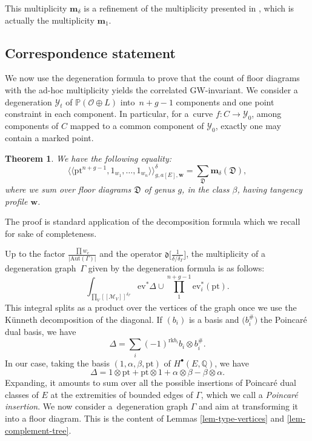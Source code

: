 \documentclass[pdftex]{sigma}
\newcommand{\fvir}[2]{[\![ #1 ]\!]^{#2}}
\newcommand{\ev}{\mathrm{ev}}
\newcommand{\pt}{\mathrm{pt}}
\newcommand{\PP}{\mathbb{P}}
\newcommand{\QQ}{\mathbb{Q}}
\newcommand{\bfw}{ {\boldsymbol w} }
\newcommand{\bfm}{ {\boldsymbol m} }
\newcommand{\Dfk}{\mathfrak{D}}
\newcommand{\dfk}{\mathfrak{d}}
\newcommand{\M}{\mathcal{M}}
\renewcommand{\O}{\mathcal{O}}
\newcommand{\Y}{\mathcal{Y}}
\newcommand{\gen}[1]{\big\langle #1 \big\rangle}
\numberwithin{equation}{section}
\newtheorem{theo}{Theorem}[section]
\theoremstyle{definition}
\begin{document}
This multiplicity $\bfm_\delta$ is a refinement of the multiplicity presented in \cite{blomme2022floor}, which is actually the multiplicity $\bfm_1$.



\subsection{Correspondence statement}

We now use the degeneration formula to prove that the count of floor diagrams with the ad-hoc multiplicity yields the correlated GW-invariant. We consider a degeneration $\Y_t$ of $\PP(\O\oplus L)$ into~${n+g-1}$ components and one point constraint in each component. In particular, for a~curve $f\colon C\to\Y_0$, among components of $C$ mapped to a common component of $\Y_0$, exactly one may contain a marked point.

\begin{theo}\label{theo-correspondence-diagrams}
 We have the following equality:
 \[ \gen{\gen{\pt^{n+g-1},1_{w_1},\dots,1_{w_n}}}^\delta_{g,a[E],\bfw} =
 \sum_\Dfk \bfm_\delta(\Dfk), \]
 where we sum over floor diagrams $\Dfk$ of genus $g$, in the class $\beta$, having tangency profile $\bfw$.
\end{theo}

The proof is standard application of the decomposition formula which we recall for sake of completeness.

Up to the factor $\frac{\prod w_e}{|\mathrm{Aut}(\Gamma)|}$ and the operator $\dfk\big[\frac{1}{\delta/\delta_\Gamma}\big]$, the multiplicity of a degeneration graph~$\Gamma$ given by the degeneration formula is as follows:
\[ \int_{\prod_V\fvir{\M_V}{\delta_\Gamma}}
\ev^*\Delta\cup\prod_1^{n+g-1}\ev_i^*(\pt). \]
This integral splits as a product over the vertices of the graph once we use the K\"unneth decomposition of the diagonal. If $(b_i)$ is a basis and $\bigl(b_i^\#\bigr)$ the Poincar\'e dual basis, we have
\[
\Delta=\sum_i (-1)^{\mathrm{rk} b_i}b_i\otimes b_i^{\#}.
\] In our case, taking the basis $(1,\alpha,\beta,\pt)$ of $H^\bullet(E,\QQ)$, we have
\[ \Delta = 1\otimes\pt +\pt\otimes 1 + \alpha\otimes\beta -\beta\otimes\alpha. \]
Expanding, it amounts to sum over all the possible insertions of Poincar\'e dual classes of $E$ at the extremities of bounded edges of $\Gamma$, which we call a \textit{Poincar\'e insertion}. We now consider a~degeneration graph $\Gamma$ and aim at transforming it into a floor diagram. This is the content of Lemmas \ref{lem-type-vertices} and \ref{lem-complement-tree}.
\end{document}
